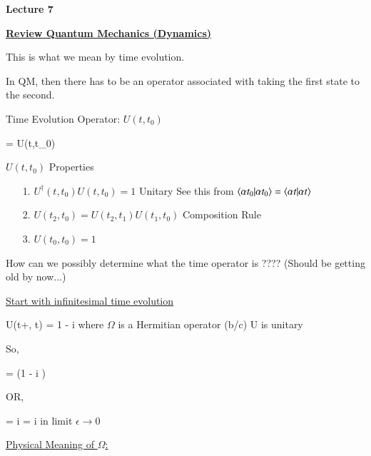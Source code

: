 



\thispagestyle{fancy}

\begin{center}
{\huge \textbf{Lecture 7}}
\end{center}

{\fontsize{14}{16}\selectfont

\textbf{\underline{Review Quantum Mechanics (Dynamics)}}

\be
{} \rightarrow {}
\ee

This is what we mean by time evolution.  

In QM, then there has to be an operator associated with taking the first state to the second. 

Time Evolution Operator:  $U(t,t_0)$


\be
{} = U(t,t_0) 
\ee

$U(t,t_0)$ Properties
\begin{itemize}
\item[1.] $U^\dagger(t,t_0)U(t,t_0) = 1$ Unitary  See this from $\braket{\alpha t_0|\alpha t_0} = \braket{\alpha t|\alpha t}$
\item[2.] $U(t_2, t_0) = U(t_2,t_1)U(t_1,t_0)$ Composition Rule
\item[3.] $U(t_0, t_0) = 1$
\end{itemize}


How can we possibly determine what the time operator is ????
(Should be getting old by now...)


\underline{Start with infinitesimal time evolution}

\be
U(t+\epsilon, t)  = 1 - i\Omega \epsilon
\ee
where $\Omega$ is a Hermitian operator (b/c) U is unitary


So, 

\be
{} = (1 - i \epsilon \Omega ) 
\ee

OR,

\be
\Omega {} = i  = i  
\ee
in limit $\epsilon \rightarrow 0$


\underline{Physical Meaning of $\Omega$:}

}
